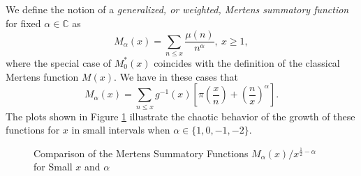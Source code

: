 \documentclass[11pt,reqno,a4letter]{article}
\numberwithin{figure}{section}
\numberwithin{table}{section}
\theoremstyle{plain}
\numberwithin{theorem}{section}
\theoremstyle{definition}
\begin{document}
We define the notion of a 
\emph{generalized, or weighted, Mertens summatory function} for fixed 
$\alpha \in \mathbb{C}$ as 
\begin{equation} 
\label{eqn_MAlphaAstx_WeightedClassicalMertensFuncs_def_v1} 
M_{\alpha}(x) = \sum_{n \leq x} \frac{\mu(n)}{n^{\alpha}},\ x \geq 1, 
\end{equation} 
where the special case of $M_0^{\ast}(x)$ 
coincides with the definition of the classical Mertens function $M(x)$. 
We have in these cases that 
\begin{equation} 
\label{eqn_GenMertensFuncs_MAlphax_def_v2} 
M_{\alpha}(x) = \sum_{n \leq x} g^{-1}(x) \left[\pi\left(\frac{x}{n}\right) + 
     \left(\frac{n}{x}\right)^{\alpha}\right]. 
\end{equation} 
The plots shown in Figure \ref{figure_MertensSummatoryFns_init_plots} 
illustrate the chaotic behavior of the growth of these 
functions for $x$ in small intervals when $\alpha \in \{1, 0, -1, -2\}$. 

\begin{figure}[ht!] 

\begin{minipage}{\textwidth} 
\begin{center}
\end{center} 
\end{minipage} 

\bigskip

\begin{minipage}{\textwidth} 
\begin{center}
\end{center}
\end{minipage} 

\caption{Comparison of the Mertens Summatory Functions $M_{\alpha}(x) / x^{\frac{1}{2}-\alpha}$ 
         for Small $x$ and $\alpha$} 
\label{figure_MertensSummatoryFns_init_plots} 

\end{figure} 
\end{document}
